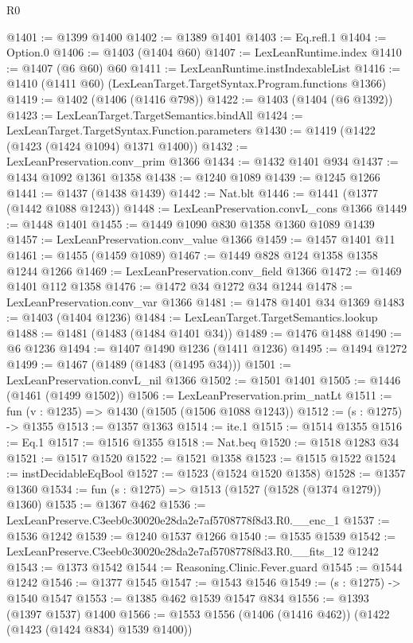 \begin{lexlean}{R0}
\begin{coremodule}
@1401 := @1399 @1400
@1402 := @1389 @1401
@1403 := Eq.refl.{1}
@1404 := Option.{0}
@1406 := @1403 (@1404 @60)
@1407 := LexLeanRuntime.index
@1410 := @1407 (@6 @60) @60
@1411 := LexLeanRuntime.instIndexableList
@1416 := @1410 (@1411 @60) (LexLeanTarget.TargetSyntax.Program.functions @1366)
@1419 := @1402 (@1406 (@1416 @798))
@1422 := @1403 (@1404 (@6 @1392))
@1423 := LexLeanTarget.TargetSemantics.bindAll
@1424 := LexLeanTarget.TargetSyntax.Function.parameters
@1430 := @1419 (@1422 (@1423 (@1424 @1094) @1371 @1400))
@1432 := LexLeanPreservation.conv_prim @1366
@1434 := @1432 @1401 @934
@1437 := @1434 @1092 @1361 @1358
@1438 := @1240 @1089
@1439 := @1245 @1266
@1441 := @1437 (@1438 @1439)
@1442 := Nat.blt
@1446 := @1441 (@1377 (@1442 @1088 @1243))
@1448 := LexLeanPreservation.convL_cons @1366
@1449 := @1448 @1401
@1455 := @1449 @1090 @830 @1358 @1360 @1089 @1439
@1457 := LexLeanPreservation.conv_value @1366
@1459 := @1457 @1401 @11
@1461 := @1455 (@1459 @1089)
@1467 := @1449 @828 @124 @1358 @1358 @1244 @1266
@1469 := LexLeanPreservation.conv_field @1366
@1472 := @1469 @1401 @112 @1358
@1476 := @1472 @34 @1272 @34 @1244
@1478 := LexLeanPreservation.conv_var @1366
@1481 := @1478 @1401 @34 @1369
@1483 := @1403 (@1404 @1236)
@1484 := LexLeanTarget.TargetSemantics.lookup
@1488 := @1481 (@1483 (@1484 @1401 @34))
@1489 := @1476 @1488
@1490 := @6 @1236
@1494 := @1407 @1490 @1236 (@1411 @1236)
@1495 := @1494 @1272
@1499 := @1467 (@1489 (@1483 (@1495 @34)))
@1501 := LexLeanPreservation.convL_nil @1366
@1502 := @1501 @1401
@1505 := @1446 (@1461 (@1499 @1502))
@1506 := LexLeanPreservation.prim_natLt
@1511 := fun (v : @1235) => @1430 (@1505 (@1506 @1088 @1243))
@1512 := (s : @1275) -> @1355
@1513 := @1357 @1363
@1514 := ite.{1}
@1515 := @1514 @1355
@1516 := Eq.{1}
@1517 := @1516 @1355
@1518 := Nat.beq
@1520 := @1518 @1283 @34
@1521 := @1517 @1520
@1522 := @1521 @1358
@1523 := @1515 @1522
@1524 := instDecidableEqBool
@1527 := @1523 (@1524 @1520 @1358)
@1528 := @1357 @1360
@1534 := fun (s : @1275) => @1513 (@1527 (@1528 (@1374 @1279)) @1360)
@1535 := @1367 @462
@1536 := LexLeanPreserve.C3eeb0c30020e28da2e7af5708778f8d3.R0.__enc_1
@1537 := @1536 @1242
@1539 := @1240 @1537 @1266
@1540 := @1535 @1539
@1542 := LexLeanPreserve.C3eeb0c30020e28da2e7af5708778f8d3.R0.__fits_12 @1242
@1543 := @1373 @1542
@1544 := Reasoning.Clinic.Fever.guard
@1545 := @1544 @1242
@1546 := @1377 @1545
@1547 := @1543 @1546
@1549 := (s : @1275) -> @1540 @1547
@1553 := @1385 @462 @1539 @1547 @834
@1556 := @1393 (@1397 @1537) @1400
@1566 := @1553 @1556 (@1406 (@1416 @462)) (@1422 (@1423 (@1424 @834) @1539 @1400))

\end{coremodule}
\end{lexlean}
